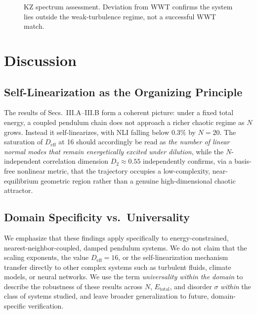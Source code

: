 \documentclass[aps,pre,12pt]{revtex4-2}
\begin{document}
\begin{figure}[htbp]
\centering
{}
\caption{KZ spectrum assessment. Deviation from WWT confirms the system lies outside the weak-turbulence regime, not a successful WWT match.}
\label{fig:kz}
\end{figure}

\section{Discussion}

\subsection{Self-Linearization as the Organizing Principle}
The results of Secs.~III.A--III.B form a coherent picture: under a fixed total energy, a coupled pendulum chain does not approach a richer chaotic regime as $N$ grows. Instead it self-linearizes, with NLI falling below $0.3\%$ by $N=20$. The saturation of $D_{\text{eff}}$ at 16 should accordingly be read as \emph{the number of linear normal modes that remain energetically excited under dilution}, while the $N$-independent correlation dimension $D_2\approx0.55$ independently confirms, via a basis-free nonlinear metric, that the trajectory occupies a low-complexity, near-equilibrium geometric region rather than a genuine high-dimensional chaotic attractor.

\subsection{Domain Specificity vs.\ Universality}
We emphasize that these findings apply specifically to energy-constrained, nearest-neighbor-coupled, damped pendulum systems. We do not claim that the scaling exponents, the value $D_{\text{eff}}=16$, or the self-linearization mechanism transfer directly to other complex systems such as turbulent fluids, climate models, or neural networks. We use the term \emph{universality within the domain} to describe the robustness of these results across $N$, $E_{\text{total}}$, and disorder $\sigma$ \emph{within} the class of systems studied, and leave broader generalization to future, domain-specific verification.
\end{document}
